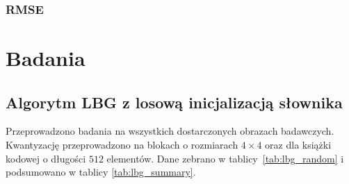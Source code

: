 \documentclass{article}
\begin{document}
\subsubsection{RMSE}

\section{Badania}

\subsection{Algorytm LBG z losową inicjalizacją słownika}

Przeprowadzono badania na wszystkich dostarczonych obrazach badawczych. Kwantyzację przeprowadzono na blokach o rozmiarach $4 \times 4$ oraz dla książki
kodowej o długości $512$ elementów. Dane zebrano w \mbox{tablicy \ref{tab:lbg_random}} i podsumowano w tablicy \mbox{\ref{tab:lbg_summary}}.
\end{document}
